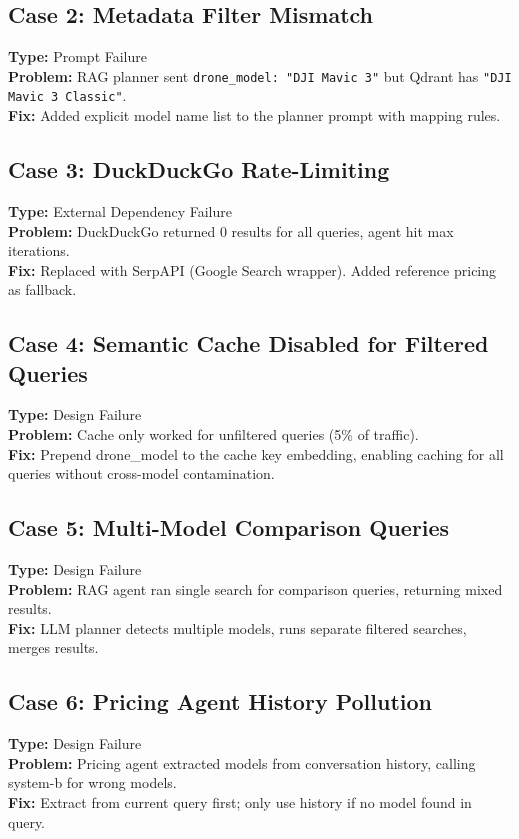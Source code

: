 \documentclass[12pt,a4paper]{article}
\begin{document}
\subsection{Case 2: Metadata Filter Mismatch}
\textbf{Type:} Prompt Failure \\
\textbf{Problem:} RAG planner sent \texttt{drone\_model: "DJI Mavic 3"} but Qdrant has \texttt{"DJI Mavic 3 Classic"}. \\
\textbf{Fix:} Added explicit model name list to the planner prompt with mapping rules.

\subsection{Case 3: DuckDuckGo Rate-Limiting}
\textbf{Type:} External Dependency Failure \\
\textbf{Problem:} DuckDuckGo returned 0 results for all queries, agent hit max iterations. \\
\textbf{Fix:} Replaced with SerpAPI (Google Search wrapper). Added reference pricing as fallback.

\subsection{Case 4: Semantic Cache Disabled for Filtered Queries}
\textbf{Type:} Design Failure \\
\textbf{Problem:} Cache only worked for unfiltered queries (5\% of traffic). \\
\textbf{Fix:} Prepend drone\_model to the cache key embedding, enabling caching for all queries without cross-model contamination.

\subsection{Case 5: Multi-Model Comparison Queries}
\textbf{Type:} Design Failure \\
\textbf{Problem:} RAG agent ran single search for comparison queries, returning mixed results. \\
\textbf{Fix:} LLM planner detects multiple models, runs separate filtered searches, merges results.

\subsection{Case 6: Pricing Agent History Pollution}
\textbf{Type:} Design Failure \\
\textbf{Problem:} Pricing agent extracted models from conversation history, calling system-b for wrong models. \\
\textbf{Fix:} Extract from current query first; only use history if no model found in query.
\end{document}

